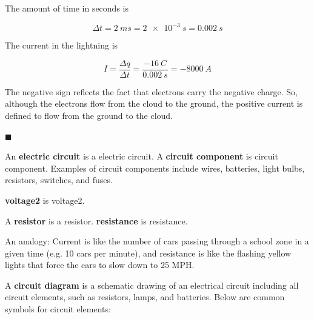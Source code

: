 \documentclass[dvipsnames]{article}
\begin{document}
The amount of time in seconds is

\begin{equation*}
    \Delta t = \SI{2}{ms} = \SI{2e-3}{s} = \SI{0.002}{s}
\end{equation*}

The current in the lightning is

\begin{equation*}
    I = \frac{\Delta q}{\Delta t} = \frac{-\SI{16}{C}}{\SI{0.002}{s}} = \SI{-8000}{A}
\end{equation*}

The negative sign reflects the fact that electrons carry the negative charge. So, although the electrons flow from the cloud to the ground, the positive current is defined to flow from the ground to the cloud.

\hfill $\blacksquare$

An \textbf{\gls{electric circuit}} is a \glsdesc{electric circuit}. A \textbf{\gls{circuit component}} is \glsdesc{circuit component}. Examples of circuit components include wires, batteries, light bulbs, resistors, switches, and fuses.

\textbf{\Gls{voltage2}} is \glsdesc{voltage2}.

A \textbf{\gls{resistor}} is a \glsdesc{resistor}. \textbf{\Gls{resistance}} is \glsdesc{resistance}.


An analogy: Current is like the number of cars passing through a school zone in a given time (e.g. 10 cars per minute), and resistance is like the flashing yellow lights that force the cars to slow down to 25 MPH.


A \textbf{circuit diagram} is a schematic drawing of an electrical circuit including all circuit elements, such as resistors, lamps, and batteries. Below are common symbols for circuit elements:

\begin{center}

\end{center}
\end{document}
